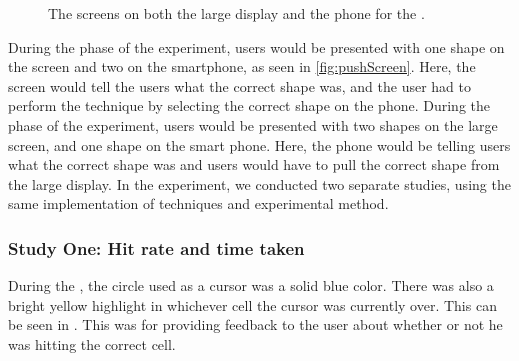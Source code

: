 \begin{figure}[H]
	\hspace{0.01\columnwidth}
	\caption{The screens on both the large display and the phone for the \accuracy.}
\end{figure}

During the \push phase of the experiment, users would be presented with one shape on the screen and two on the smartphone, as seen in \cref{fig:pushScreen}.
Here, the screen would tell the users what the correct shape was, and the user had to perform the technique by selecting the correct shape on the phone.
During the \pull phase of the experiment, users would be presented with two shapes on the large screen, and one shape on the smart phone.
Here, the phone would be telling users what the correct shape was and users would have to pull the correct shape from the large display. 
In the experiment, we conducted two separate studies, using the same implementation of techniques and experimental method. 

\subsubsection{Study One: Hit rate and time taken} 
During the \target, the circle used as a cursor was a solid blue color. 
There was also a bright yellow highlight in whichever cell the cursor was currently over.
This can be seen in .
This was for providing feedback to the user about whether or not he was hitting the correct cell. 

